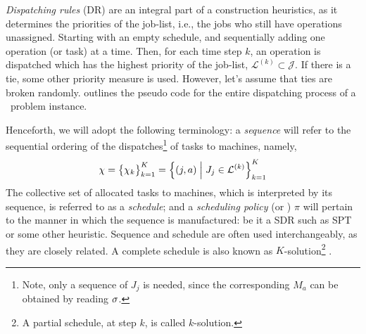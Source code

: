 \emph{Dispatching rules} (DR) are an integral part of a construction 
heuristics, as it determines the priorities of the job-list, i.e., 
the jobs who still have operations unassigned. 
Starting with an empty schedule, and sequentially adding one operation (or 
task) at a time. Then, for each time step $k$, an operation is dispatched which 
has the highest priority of the 
job-list, \mbox{$\mathcal{L}^{(k)}\subset\mathcal{J}$}.
If there is a tie, some other priority measure is used. 
However, let's assume that ties are broken randomly. 
 outlines the pseudo code for the entire dispatching 
process of a \JSP\ problem instance.



Henceforth, we will adopt the following terminology: a \emph{sequence} will 
refer to the sequential ordering of the dispatches\footnote{Note, 
only a sequence of $J_j$ is needed, since the corresponding $M_a$ can be 
    obtained by reading ${\mathbf{\sigma}}$.} 
of tasks to machines, namely, 
\begin{equation}
  {\mathbf{\chi}} = \big\{\chi_k\big\}_{k=1}^K
        = \left\{(j,a)\;\middle|\;J_j\in\mathcal{L}^{(k)}\right\}_{k=1}^K
\end{equation}
The collective set of allocated tasks to machines, which is interpreted by its 
sequence, is referred to as a \emph{schedule};
and a \emph{scheduling policy} (or \dr) $\pi$ will pertain to the manner in 
which the sequence is manufactured: be it a 
SDR such as SPT or some other heuristic. 
Sequence and schedule are often used interchangeably, as they are closely 
related. A complete schedule is also known as $K$-solution\footnote{A partial 
schedule, at step $k$, is called $k$-solution.} \citep{Bertsekas97}.

